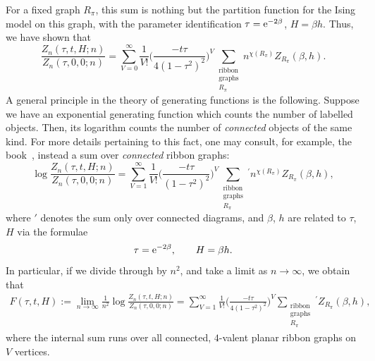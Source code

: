 \documentclass[10pt,a4paper]{amsart}
\numberwithin{equation}{section}
\begin{document}
For a fixed graph $R_{\pi}$, this sum is nothing but the partition function for the Ising model on this graph, with the parameter identification
$\tau = {\rm e}^{-2\beta}$, $H = \beta h$. Thus, we have shown that
 \begin{equation*}
 \frac{Z_n(\tau,t,H;n)}{Z_n(\tau,0,0;n)} = \sum_{V = 0}^{\infty}\frac{1}{V!} \biggl(\frac{-t\tau}{4(1-\tau^2)^2}\biggr)^V\sum_{\substack{\text{ribbon}\\\text{graphs}\\ R_{\pi} }} n^{\chi(R_{\pi})} Z_{R_{\pi}}(\beta,h).
 \end{equation*}
A general principle in the theory of generating functions is the following. Suppose we have an exponential generating function which counts the number of labelled objects. Then, its logarithm counts the number of \textit{connected} objects of the same kind. For more details pertaining to this fact, one may consult, for example, the book~\cite[Section~5]{Stanley}, instead a sum over \textit{connected} ribbon graphs:
 \begin{equation*}
 \log \frac{Z_n(\tau,t,H;n)}{Z_n(\tau,0,0;n)} = \sum_{V = 1}^{\infty}\frac{1}{V!}\biggl(\frac{-t\tau}{(1-\tau^2)^2}\biggr)^V\sum_{\substack{\text{ribbon}\\\text{graphs}\\ R_{\pi} }} {}^{'} n^{\chi(R_{\pi})} Z_{R_{\pi}}(\beta,h),
 \end{equation*}
where $'$ denotes the sum only over connected diagrams, and $\beta$, $h$ are related to $\tau$, $H$ via the formulae
 \begin{equation*}
 \tau = {\rm e}^{-2\beta}, \qquad H = \beta h.
 \end{equation*}
In particular, if we divide through by $n^2$, and take a limit as $n\to \infty$, we obtain that
 \begin{gather}\label{generating-function-genus-0}
 F(\tau,t,H) := \lim_{n\to\infty} \frac{1}{n^2}\log \frac{Z_n(\tau,t,H;n)}{Z_n(\tau,0,0;n)} = \sum_{V = 1}^{\infty}\frac{1}{V!} \biggl(\frac{-t\tau}{4(1-\tau^2)^2}\biggr)^V\sum_{\substack{\text{ribbon}\\\text{graphs}\\ R_{\pi} }} {}^{'} Z_{R_{\pi}}(\beta,h),
 \end{gather}
where the internal sum runs over all connected, $4$-valent planar ribbon graphs on $V$ vertices.
\end{document}
